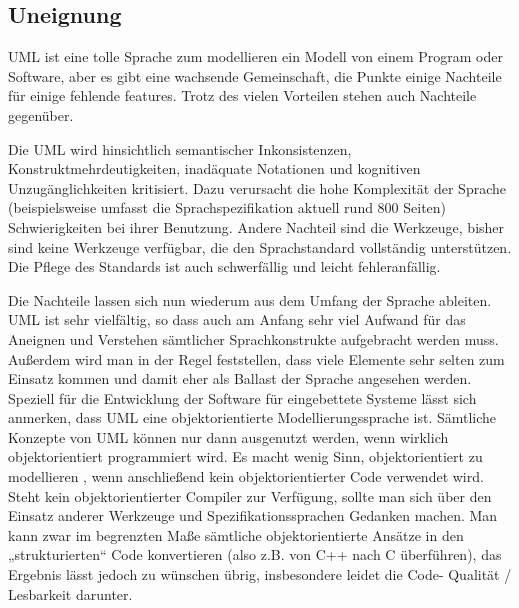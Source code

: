\subsection{Uneignung}
UML ist eine tolle Sprache zum modellieren ein Modell von einem Program oder Software, aber es gibt eine wachsende Gemeinschaft, die Punkte einige Nachteile für einige fehlende features. Trotz des vielen Vorteilen stehen auch Nachteile gegenüber.

Die UML wird hinsichtlich semantischer Inkonsistenzen, Konstruktmehrdeutigkeiten, inadäquate Notationen und kognitiven Unzugänglichkeiten kritisiert. Dazu  verursacht die hohe Komplexität der Sprache (beispielsweise umfasst die Sprachspezifikation aktuell rund 800 Seiten)  Schwierigkeiten bei ihrer Benutzung.
Andere Nachteil sind die Werkzeuge, bisher sind keine Werkzeuge verfügbar, die den Sprachstandard vollständig unterstützen.
Die Pflege des Standards ist auch schwerfällig und leicht fehleranfällig.






Die Nachteile lassen sich nun wiederum aus dem Umfang der Sprache ableiten. UML ist sehr vielfältig, so dass auch am Anfang  sehr viel Aufwand für das Aneignen und Verstehen sämtlicher Sprachkonstrukte aufgebracht werden muss.\\ Außerdem wird man in der  Regel feststellen, dass viele Elemente sehr selten zum Einsatz kommen und damit eher als Ballast der Sprache angesehen werden\cite{MT015}.\\

Speziell für die Entwicklung der Software für eingebettete Systeme lässt sich anmerken, dass UML eine objektorientierte Modellierungssprache ist. Sämtliche Konzepte von UML können nur dann ausgenutzt werden, wenn wirklich objektorientiert programmiert wird. Es macht wenig Sinn, objektorientiert zu modellieren , wenn  anschließend kein objektorientierter Code verwendet wird. Steht kein objektorientierter Compiler zur Verfügung, sollte man sich über den Einsatz anderer Werkzeuge und Spezifikationssprachen Gedanken machen. Man kann zwar im begrenzten Maße sämtliche objektorientierte Ansätze in den „strukturierten“ Code konvertieren (also z.B. von C++ nach C überführen), das Ergebnis lässt jedoch zu wünschen übrig, insbesondere leidet die Code- Qualität / Lesbarkeit darunter\cite{MT015}.\\

